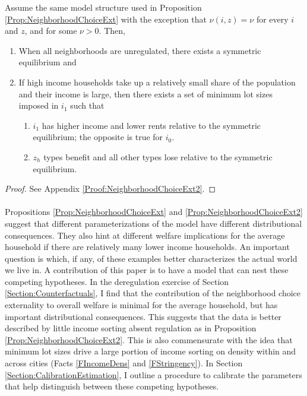 \documentclass[11pt]{article}
\begin{document}
	\begin{Proposition}\label{Prop:NeighborhoodChoiceExt2} 
		
		
		Assume the same model structure used in Proposition \ref{Prop:NeighborhoodChoiceExt} with the exception that $\nu(i, z) = \nu$ for every $i$ and $z$, and for some $\nu > 0$. Then, 
		
		\begin{enumerate}
			\item When all neighborhoods are unregulated, there exists a symmetric equilibrium and
			
			\item If high income households take up a relatively small share of the population and their income is large, then there exists a set of minimum lot sizes imposed in $i_{1}$ such that
			
			\begin{enumerate}
				\item $i_{1}$ has higher income and lower rents relative to the symmetric equilibrium; the opposite is true for $i_{0}$.
				\item  $z_{h}$ types benefit and all other types lose relative to the symmetric equilibrium.
			\end{enumerate}	
		\end{enumerate}
	\end{Proposition}
	
	\begin{proof}
		See Appendix \ref{Proof:NeighborhoodChoiceExt2}.
	\end{proof}
	

	
	\paragraph*{}
	Propositions \ref{Prop:NeighborhoodChoiceExt} and \ref{Prop:NeighborhoodChoiceExt2} suggest that different parameterizations of the model have different distributional consequences. They also hint at different welfare implications for the average household if there are relatively many lower income households. An important question is which, if any, of these examples better characterizes the actual world we live in. A contribution of this paper is to have a model that can nest these competing hypotheses. In the deregulation exercise of Section \ref{Section:Counterfactuals}, I find that the contribution of the neighborhood choice externality to overall welfare is minimal for the average household, but has important distributional consequences. This suggests that the data is better described by little income sorting absent regulation as in Proposition \ref{Prop:NeighborhoodChoiceExt2}. This is also commensurate with the idea that minimum lot sizes drive a large portion of income sorting on density within and across cities (Facts \ref{FIncomeDens} and \ref{FStringency}). In Section \ref{Section:CalibrationEstimation}, I outline a procedure to calibrate the parameters that help distinguish between these competing hypotheses. 
	
\end{document}
